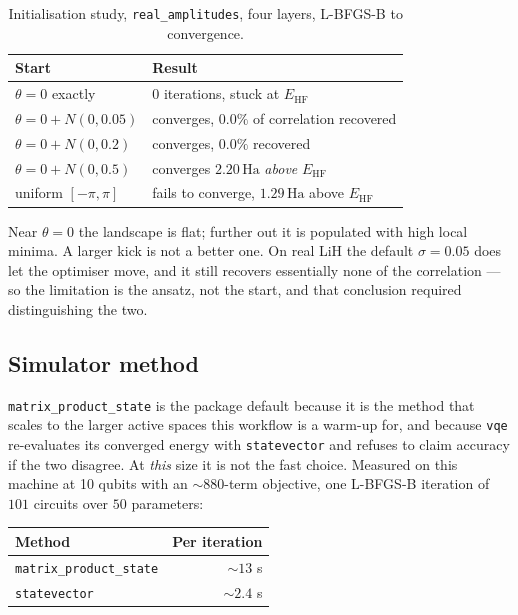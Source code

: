 \documentclass[11pt,a4paper]{article}
\newcommand{\Ha}{\ensuremath{\,\mathrm{Ha}}}
\newcommand{\code}[1]{\texttt{\small #1}}
\begin{document}
\begin{table}[htbp]
\centering
\caption{Initialisation study, \code{real\_amplitudes}, four layers, L-BFGS-B to
convergence.}
\label{tab:start}
\small
\begin{tabular}{ll}
\toprule
Start & Result \\
\midrule
$\theta = 0$ exactly        & $0$ iterations, stuck at $E_{\mathrm{HF}}$ \\
$\theta = 0 + N(0, 0.05)$   & converges, $0.0\%$ of correlation recovered \\
$\theta = 0 + N(0, 0.2)$    & converges, $0.0\%$ recovered \\
$\theta = 0 + N(0, 0.5)$    & converges $2.20\Ha$ \emph{above} $E_{\mathrm{HF}}$ \\
uniform $[-\pi, \pi]$       & fails to converge, $1.29\Ha$ above $E_{\mathrm{HF}}$ \\
\bottomrule
\end{tabular}
\end{table}

Near $\theta = 0$ the landscape is flat; further out it is populated with high
local minima. A larger kick is not a better one. On real LiH the default
$\sigma = 0.05$ does let the optimiser move, and it still recovers essentially
none of the correlation --- so the limitation is the ansatz, not the start, and
that conclusion required distinguishing the two.

\subsection{Simulator method}

\code{matrix\_product\_state} is the package default because it is the method
that scales to the larger active spaces this workflow is a warm-up for, and
because \code{vqe} re-evaluates its converged energy with \code{statevector} and
refuses to claim accuracy if the two disagree. At \emph{this} size it is not the
fast choice. Measured on this machine at 10 qubits with an ${\sim}880$-term
objective, one L-BFGS-B iteration of $101$ circuits over $50$ parameters:

\begin{center}
\small
\begin{tabular}{lr}
\toprule
Method & Per iteration \\
\midrule
\code{matrix\_product\_state} & ${\sim}13$ s \\
\code{statevector}            & ${\sim}2.4$ s \\
\bottomrule
\end{tabular}
\end{center}
\end{document}
